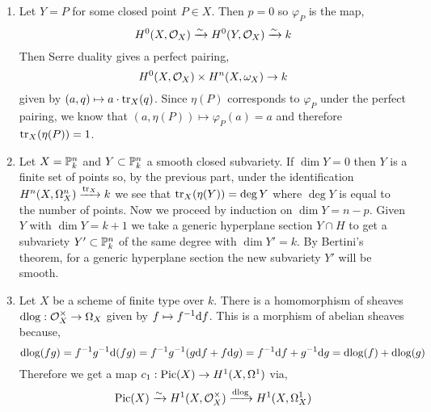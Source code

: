\documentclass[12pt]{article}
\begin{document}
\begin{enumerate}
\item Let $Y = P$ for some closed point $P \in X$. Then $p = 0$ so $\varphi_P$ is the map,
\[ H^0(X, \struct{X}) \iso H^0(Y, \struct{X}) \iso k \]
Then Serre duality gives a perfect pairing,
\[ H^0(X, \struct{X}) \times H^n(X, \omega_X) \to k \]
given by $(a, q) \mapsto a \cdot \tr_X(q)$. Since $\eta(P)$ corresponds to $\varphi_P$ under the perfect pairing, we know that $(a, \eta(P)) \mapsto \varphi_P(a) = a$ and therefore $\tr_X(\eta(P)) = 1$. 

\item Let $X = \P^n_k$ and $Y \subset \P^n_k$ a smooth closed subvariety. If $\dim{Y} = 0$ then $Y$ is a finite set of points so, by the previous part, under the identification $H^n(X, \Omega_X^n) \xrightarrow{\tr_X} k$ we see that $\tr_X(\eta(Y)) = \deg{Y}$ where $\deg{Y}$ is equal to the number of points. Now we proceed by induction on $\dim{Y} = n - p$. Given $Y$ with $\dim{Y} = k + 1$ we take a generic hyperplane section $Y \cap H$ to get a subvariety $Y' \subset \P^{n}_k$ of the same degree with $\dim{Y'} = k$. By Bertini's theorem, for a generic hyperplane section the new subvariety $Y'$ will be smooth. 

\item Let $X$ be a scheme of finite type over $k$. There is a homomorphism of sheaves $\d{\log} : \struct{X}^\times \to \Omega_X$ given by $f \mapsto f^{-1} \d{f}$. This is a morphism of abelian sheaves because,
\[\d{\log}(fg) = f^{-1} g^{-1} \d{(fg)} = f^{-1} g^{-1} (g \d{f} + f \d{g} ) = f^{-1} \d{f} + g^{-1} \d{g} = \d{\log}(f) + \d{\log}(g) \]
Therefore we get a map $c_1 : \Pic{X} \to H^1(X, \Omega^1)$ via,
\[ \Pic{X} \iso H^1(X, \struct{X}^\times) \xrightarrow{\d{\log}} H^1(X, \Omega_X^1) \]


\end{enumerate}
\end{document}
